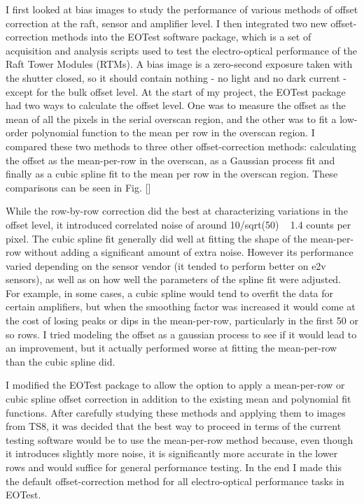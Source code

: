 
I first looked at bias images to study the performance of various methods of offset correction at the raft, sensor and amplifier level. I then integrated two new offset-correction methods into the EOTest software package, which is a set of acquisition and analysis scripts used to test the electro-optical performance of the Raft Tower Modules (RTMs). A bias image is a zero-second exposure taken with the shutter closed, so it should contain nothing - no light and no dark current - except for the bulk offset level. At the start of my project, the EOTest package had two ways to calculate the offset level. One was to measure the offset as the mean of all the pixels in the serial overscan region, and the other was to fit a low-order polynomial function to the mean per row in the overscan region. I compared these two methods to three other offset-correction methods: calculating the offset as the mean-per-row in the overscan, as a Gaussian process fit and finally as a cubic spline fit to the mean per row in the overscan region. These comparisons can be seen in Fig. []

While the row-by-row correction did the best at characterizing variations in the offset level, it introduced correlated noise of around 10/sqrt(50) ~ 1.4 counts per pixel. The cubic spline fit generally did well at fitting the shape of the mean-per-row without adding a significant amount of extra noise. However its performance varied depending on the sensor vendor (it tended to perform better on e2v sensors), as well as on how well the parameters of the spline fit were adjusted. For example, in some cases, a cubic spline would tend to overfit the data for certain amplifiers, but when the smoothing factor was increased it would come at the cost of losing peaks or dips in the mean-per-row, particularly in the first 50 or so rows. I tried modeling the offset as a gaussian process to see if it would lead to an improvement, but it actually performed worse at fitting the mean-per-row than the cubic spline did. 

I modified the EOTest package to allow the option to apply a mean-per-row or cubic spline offset correction in addition to the existing mean and polynomial fit functions. After carefully studying these methods and applying them to images from TS8, it was decided that the best way to proceed in terms of the current testing software would be to use the mean-per-row method because, even though it introduces slightly more noise, it is significantly more accurate in the lower rows and would suffice for general performance testing. In the end I made this the default offset-correction method for all electro-optical performance tasks in EOTest.

